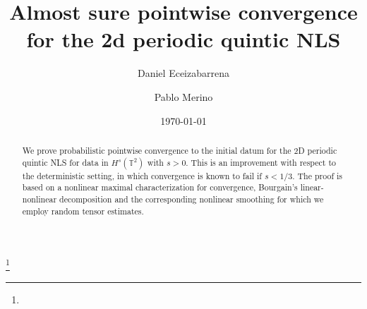 \documentclass[11pt, xcolor = dvipsnames,reqno
]{amsart}
\theoremstyle{definition}
\theoremstyle{remark}
\begin{document}
\title[Almost sure pointwise convergence for quintic NLS]{
Almost sure pointwise convergence for the 2d periodic quintic NLS
}



\author{Daniel Eceizabarrena}
\address{BCAM - Basque Center for Applied Mathematics, Bilbao, Spain.
		  e-mail: {\tt deceizabarrena@bcamath.org}
		}
		
\author{Pablo Merino}
\address{BCAM - Basque Center for Applied Mathematics, Bilbao, Spain.
		  e-mail: {\tt pmerino@bcamath.org}
		}


\thanks{}
\date{\today}



\begin{abstract}
We prove probabilistic pointwise convergence to the initial datum for the 2D periodic quintic NLS for data in $H^s(\mathbb T^2)$ with $s > 0$. 
This is an improvement with respect to the deterministic setting, in which convergence is known to fail if $s < 1/3$. 
The proof is based on a nonlinear maximal characterization for convergence, 
Bourgain's linear-nonlinear decomposition 
and the corresponding nonlinear smoothing for which we employ random tensor estimates. 
\end{abstract}

\maketitle

\end{document}
